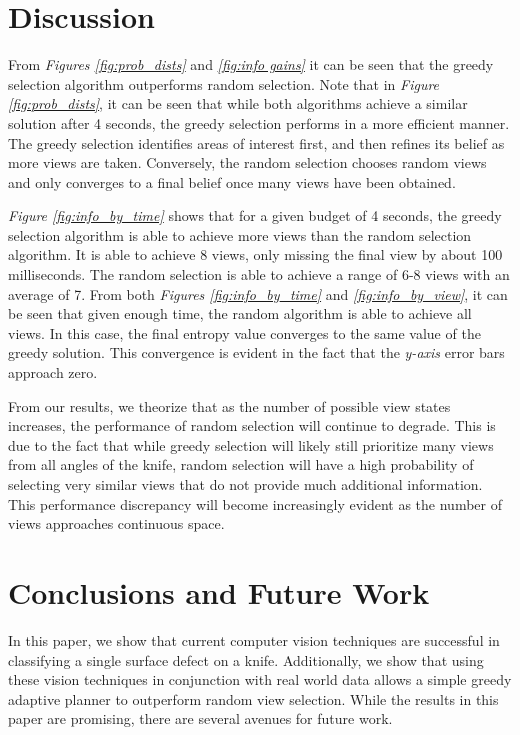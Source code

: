\documentclass[letterpaper, 10 pt, conference]{ieeeconf}  %
\begin{document}
\section{Discussion}

From \textit{Figures \ref{fig:prob_dists}} and \textit{\ref{fig:info gains}} it can be seen that the greedy selection algorithm outperforms random selection. Note that in \textit{Figure \ref{fig:prob_dists}}, it can be seen that while both algorithms achieve a similar solution after 4 seconds, the greedy selection performs in a more efficient manner. The greedy selection identifies areas of interest first, and then refines its belief as more views are taken. Conversely, the random selection chooses random views and only converges to a final belief once many views have been obtained.

\textit{Figure \ref{fig:info_by_time}} shows that for a given budget of 4 seconds, the greedy selection algorithm is able to achieve more views than the random selection algorithm. It is able to achieve 8 views, only missing the final view by about 100 milliseconds. The random selection is able to achieve a range of 6-8 views with an average of 7. From both \textit{Figures \ref{fig:info_by_time}} and \textit{\ref{fig:info_by_view}}, it can be seen that given enough time, the random algorithm is able to achieve all views. In this case, the final entropy value converges to the same value of the greedy solution. This convergence is evident in the fact that the \textit{y-axis} error bars approach zero.

From our results, we theorize that as the number of possible view states increases, the performance of random selection will continue to degrade. This is due to the fact that while greedy selection will likely still prioritize many views from all angles of the knife, random selection will have a high probability of selecting very similar views that do not provide much additional information. This performance discrepancy will become increasingly evident as the number of views approaches continuous space.

\section{Conclusions and Future Work}

In this paper, we show that current computer vision techniques are successful in classifying a single surface defect on a knife. Additionally, we show that using these vision techniques in conjunction with real world data allows a simple greedy adaptive planner to outperform random view selection. While the results in this paper are promising, there are several avenues for future work.
\end{document}
